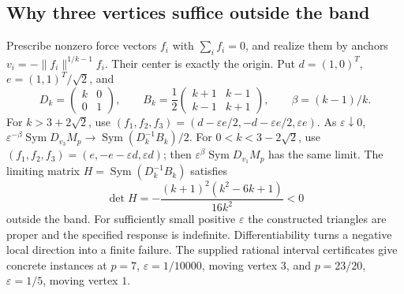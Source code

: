 \documentclass[11pt]{article}
\theoremstyle{definition}
\newcommand{\Sym}{\operatorname{Sym}}
\begin{document}
\subsection{Why three vertices suffice outside the band}
Prescribe nonzero force vectors $f_i$ with $\sum_i f_i=0$, and realize them
by anchors $v_i=-\|f_i\|^{1/k-1}f_i$. Their center is exactly the origin.
Put $d=(1,0)^T$, $e=(1,1)^T/\sqrt2$, and
\[
 D_k=\begin{pmatrix}k&0\\0&1\end{pmatrix},\qquad
 B_k=\frac12\begin{pmatrix}k+1&k-1\\k-1&k+1\end{pmatrix},\qquad
 \beta=(k-1)/k.
\]
For $k>3+2\sqrt2$, use
$(f_1,f_2,f_3)=(d-\varepsilon e/2,-d-\varepsilon e/2,\varepsilon e)$.
As $\varepsilon\downarrow0$,
$\varepsilon^{-\beta}\Sym D_{v_3}M_p\to\Sym(D_k^{-1}B_k)/2$.
For $0<k<3-2\sqrt2$, use
$(f_1,f_2,f_3)=(e,-e-\varepsilon d,\varepsilon d)$;
then $\varepsilon^{\beta}\Sym D_{v_1}M_p$ has the same limit.
The limiting matrix $H=\Sym(D_k^{-1}B_k)$ satisfies
\begin{equation}\label{eq:atomicdet}
 \det H=-\frac{(k+1)^2(k^2-6k+1)}{16k^2}<0
\end{equation}
outside the band. For sufficiently small positive $\varepsilon$ the
constructed triangles are proper and the specified response is indefinite.
Differentiability turns a negative local direction into a finite failure.
The supplied rational interval certificates give concrete instances at
$p=7$, $\varepsilon=1/10000$, moving vertex $3$, and
$p=23/20$, $\varepsilon=1/5$, moving vertex $1$.
\end{document}
